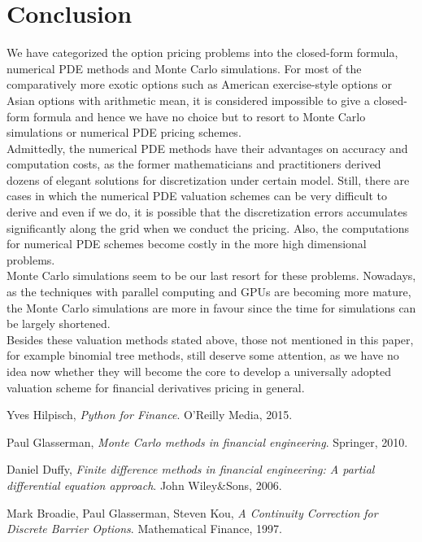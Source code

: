 \section*{Conclusion}
We have categorized the option pricing problems into the closed-form formula, numerical PDE methods and Monte Carlo simulations. For most of the comparatively more exotic options such as American exercise-style options or Asian options with arithmetic mean, it is considered impossible to give a closed-form formula and hence we have no choice but to resort to Monte Carlo simulations or numerical PDE pricing schemes.\\[1mm]
Admittedly, the numerical PDE methods have their advantages on accuracy and computation costs, as the former mathematicians and practitioners derived dozens of elegant solutions for discretization under certain model. Still, there are cases in which the numerical PDE valuation schemes can be very difficult to derive and even if we do, it is possible that the discretization errors accumulates significantly along the grid when we conduct the pricing. Also, the computations for numerical PDE schemes become costly in the more high dimensional problems.\\[1mm]
Monte Carlo simulations seem to be our last resort for these problems. Nowadays, as the techniques with parallel computing and GPUs are becoming more mature, the Monte Carlo simulations are more in favour since the time for simulations can be largely shortened.\\[1mm]
Besides these valuation methods stated above, those not mentioned in this paper, for example binomial tree methods, still deserve some attention, as we have no idea now whether they will become the core to develop a universally adopted valuation scheme for financial derivatives pricing in general.

\begin{thebibliography}{9}
Yves Hilpisch,
\textit{Python for Finance}. 
O'Reilly Media, 2015.
 
Paul Glasserman,
\textit{Monte Carlo methods in financial engineering}.
Springer, 2010.

Daniel Duffy,
\textit{Finite difference methods in financial engineering: A partial differential equation approach}.
John Wiley\&Sons, 2006.

Mark Broadie, Paul Glasserman, Steven Kou,
\textit{A Continuity Correction for Discrete Barrier Options}.
Mathematical Finance, 1997.

\end{thebibliography}
